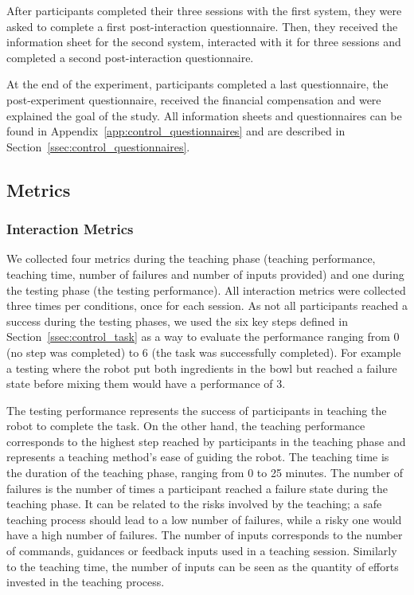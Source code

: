 After participants completed their three sessions with the first system, they were asked to complete a first post-interaction questionnaire. Then, they received the information sheet for the second system, interacted with it for three sessions and completed a second post-interaction questionnaire.

At the end of the experiment, participants completed a last questionnaire, the post-experiment questionnaire, received the financial compensation and were explained the goal of the study. All information sheets and questionnaires can be found in Appendix~\ref{app:control_questionnaires} and are described in Section~\ref{ssec:control_questionnaires}. %

\subsection{Metrics}

\subsubsection{Interaction Metrics}

We collected four metrics during the teaching phase (teaching performance, teaching time, number of failures and number of inputs provided) and one during the testing phase (the testing performance). All interaction metrics were collected three times per conditions, once for each session. As not all participants reached a success during the testing phases, we used the six key steps defined in Section~\ref{ssec:control_task} as a way to evaluate the performance ranging from 0 (no step was completed) to 6 (the task was successfully completed). For example a testing where the robot put both ingredients in the bowl but reached a failure state before mixing them would have a performance of 3. 

The testing performance represents the success of participants in teaching the robot to complete the task. On the other hand, the teaching performance corresponds to the highest step reached by participants in the teaching phase and represents a teaching method's ease of guiding the robot. The teaching time is the duration of the teaching phase, ranging from 0 to 25 minutes. The number of failures is the number of times a participant reached a failure state during the teaching phase. It can be related to the risks involved by the teaching; a safe teaching process should lead to a low number of failures, while a risky one would have a high number of failures. The number of inputs corresponds to the number of commands, guidances or feedback inputs used in a teaching session. Similarly to the teaching time, the number of inputs can be seen as the quantity of efforts invested in the teaching process.

